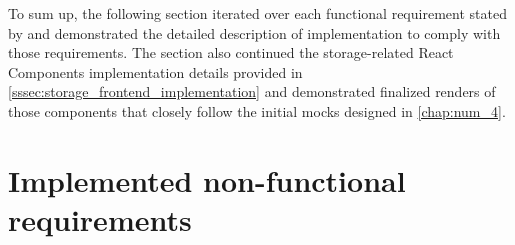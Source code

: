 To sum up, the following section iterated over each functional requirement stated by \lpa{} and demonstrated the detailed description of implementation to comply with those requirements. The section also continued the storage-related React Components implementation details provided in \autoref{sssec:storage_frontend_implementation} and demonstrated finalized renders of those components that closely follow the initial mocks designed in \autoref{chap:num_4}. 

\section{Implemented non-functional requirements}
\label{ssec:overview_of_implemented_requirements}